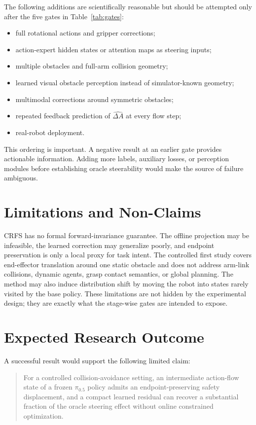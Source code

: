 \documentclass[10pt,conference]{IEEEtran}
\newcommand{\method}{\textsc{CRFS}}
\newcommand{\pizero}{\ensuremath{\pi_{0.5}}}
\newcommand{\1}{\mathbf{1}}
\begin{document}
The following additions are scientifically reasonable but should be attempted only after the five gates in Table~\ref{tab:gates}:
\begin{itemize}[leftmargin=*,nosep]
    \item full rotational actions and gripper corrections;
    \item action-expert hidden states or attention maps as steering inputs;
    \item multiple obstacles and full-arm collision geometry;
    \item learned visual obstacle perception instead of simulator-known geometry;
    \item multimodal corrections around symmetric obstacles;
    \item repeated feedback prediction of $\widehat{\Delta A}$ at every flow step;
    \item real-robot deployment.
\end{itemize}

This ordering is important. A negative result at an earlier gate provides actionable information. Adding more labels, auxiliary losses, or perception modules before establishing oracle steerability would make the source of failure ambiguous.

\section{Limitations and Non-Claims}

\method{} has no formal forward-invariance guarantee. The offline projection may be infeasible, the learned correction may generalize poorly, and endpoint preservation is only a local proxy for task intent. The controlled first study covers end-effector translation around one static obstacle and does not address arm-link collisions, dynamic agents, grasp contact semantics, or global planning. The method may also induce distribution shift by moving the robot into states rarely visited by the base policy. These limitations are not hidden by the experimental design; they are exactly what the stage-wise gates are intended to expose.

\section{Expected Research Outcome}

A successful result would support the following limited claim:

\begin{quote}
For a controlled collision-avoidance setting, an intermediate action-flow state of a frozen \pizero{} policy admits an endpoint-preserving safety displacement, and a compact learned residual can recover a substantial fraction of the oracle steering effect without online constrained optimization.
\end{quote}
\end{document}

